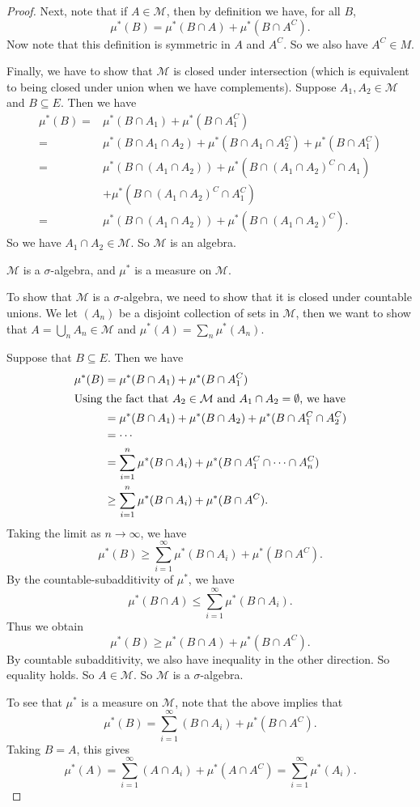 \documentclass[a4paper]{article}
\begin{document}
\begin{proof}
  Next, note that if $A \in \mathcal{M}$, then by definition we have, for all $B$,
  \[
    \mu^*(B) = \mu^*(B \cap A) + \mu^*(B \cap A^C).
  \]
  Now note that this definition is symmetric in $A$ and $A^C$. So we also have $A^C \in M$.

  Finally, we have to show that $\mathcal{M}$ is closed under intersection (which is equivalent to being closed under union when we have complements). Suppose $A_1, A_2 \in \mathcal{M}$ and $B \subseteq E$. Then we have
  \begin{align*}
    \mu^*(B) ={}& \mu^*(B \cap A_1) + \mu^*(B \cap A_1^C)\\
    ={}& \mu^*(B \cap A_1 \cap A_2) + \mu^*(B \cap A_1 \cap A_2^C) + \mu^*(B \cap A_1^C)\\
    ={}& \mu^*(B \cap (A_1 \cap A_2)) + \mu^*(B \cap (A_1\cap A_2)^C \cap A_1) \\
    &+ \mu^*(B \cap (A_1 \cap A_2)^C \cap A_1^C)\\
    ={}& \mu^*(B \cap (A_1 \cap A_2)) + \mu^*(B \cap (A_1 \cap A_2)^C).
  \end{align*}
  So we have $A_1 \cap A_2 \in \mathcal{M}$. So $\mathcal{M}$ is an algebra.
  \begin{claim}
    $\mathcal{M}$ is a $\sigma$-algebra, and $\mu^*$ is a measure on $\mathcal{M}$.
  \end{claim}
  To show that $\mathcal{M}$ is a $\sigma$-algebra, we need to show that it is closed under countable unions. We let $(A_n)$ be a disjoint collection of sets in $\mathcal{M}$, then we want to show that $A = \bigcup_n A_n \in \mathcal{M}$ and $\mu^*(A) = \sum_n \mu^*(A_n)$.

  Suppose that $B \subseteq E$. Then we have
  \begin{align*}
    \mu^*(B) &= \mu^*(B \cap A_1) + \mu^*(B \cap A_1^C)\\
    \intertext{Using the fact that $A_2 \in \mathcal{M}$ and $A_1 \cap A_2 =\emptyset$, we have}
    &= \mu^*(B \cap A_1) + \mu^*(B \cap A_2) + \mu^*(B \cap A_1^C \cap A_2^C)\\
    &= \cdots\\
    &= \sum_{i = 1}^n \mu^*(B\cap A_i) + \mu^*(B \cap A_1^C \cap \cdots \cap A_n^C)\\
    &\geq \sum_{i = 1}^n \mu^*(B \cap A_i) + \mu^*(B \cap A^C).
  \end{align*}
  Taking the limit as $n \to \infty$, we have
  \[
    \mu^*(B) \geq \sum_{i = 1}^\infty \mu^*(B \cap A_i) + \mu^*(B \cap A^C).
  \]
  By the countable-subadditivity of $\mu^*$, we have
  \[
    \mu^*(B \cap A) \leq \sum_{i = 1}^\infty \mu^*(B \cap A_i).
  \]
  Thus we obtain
  \[
    \mu^*(B) \geq \mu^*(B \cap A) + \mu^*(B \cap A^C).
  \]
  By countable subadditivity, we also have inequality in the other direction. So equality holds. So $A \in \mathcal{M}$. So $\mathcal{M}$ is a $\sigma$-algebra.

  To see that $\mu^*$ is a measure on $\mathcal{M}$, note that the above implies that
  \[
    \mu^*(B) = \sum_{i = 1}^\infty (B \cap A_i) + \mu^*(B \cap A^C).
  \]
  Taking $B = A$, this gives
  \[
    \mu^*(A) = \sum_{i = 1}^\infty (A \cap A_i) + \mu^*(A \cap A^C) = \sum_{i = 1}^\infty \mu^*(A_i).
  \]
\end{proof}
\end{document}
